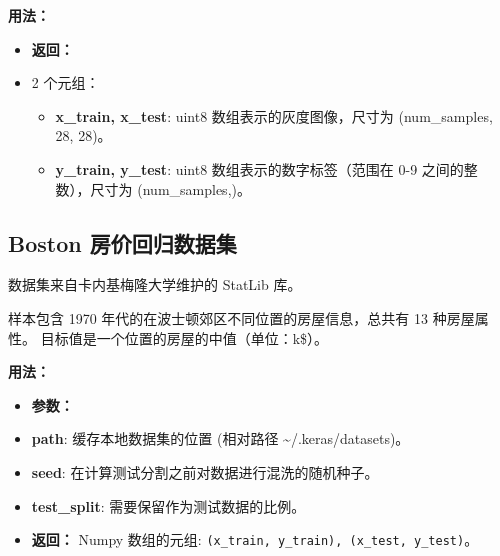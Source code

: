\textbf{用法：}\label{ux7528ux6cd5-5}

\begin{Shaded}
\begin{Highlighting}[]
  

\OperatorTok{=} 
\end{Highlighting}
\end{Shaded}

\begin{itemize}
\tightlist
\item
  \textbf{返回：}
\item
  2 个元组：

  \begin{itemize}
  \tightlist
  \item
    \textbf{x\_train, x\_test}: uint8 数组表示的灰度图像，尺寸为
    (num\_samples, 28, 28)。
  \item
    \textbf{y\_train, y\_test}: uint8 数组表示的数字标签（范围在 0-9
    之间的整数），尺寸为 (num\_samples,)。
  \end{itemize}
\end{itemize}


\subsection{Boston
房价回归数据集}\label{boston-ux623fux4ef7ux56deux5f52ux6570ux636eux96c6}

数据集来自卡内基梅隆大学维护的 StatLib 库。

样本包含 1970 年代的在波士顿郊区不同位置的房屋信息，总共有 13
种房屋属性。 目标值是一个位置的房屋的中值（单位：k\$）。

\textbf{用法：}\label{ux7528ux6cd5-6}

\begin{Shaded}
\begin{Highlighting}[]
  

\OperatorTok{=} 
\end{Highlighting}
\end{Shaded}

\begin{itemize}
\item
  \textbf{参数：}
\item
  \textbf{path}: 缓存本地数据集的位置 (相对路径
  \textasciitilde{}/.keras/datasets)。
\item
  \textbf{seed}: 在计算测试分割之前对数据进行混洗的随机种子。
\item
  \textbf{test\_split}: 需要保留作为测试数据的比例。
\item
  \textbf{返回：} Numpy 数组的元组:
  \texttt{(x\_train,\ y\_train),\ (x\_test,\ y\_test)}。
\end{itemize}

\newpage
